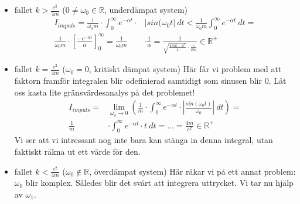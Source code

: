 \documentclass[10pt,a4paper]{article}
\begin{document}
\begin{itemize}
\item fallet $k>\frac{c^2}{4m}$ ($0\neq\omega_0 \in \mathbb{R}$, underdämpat system)
\begin{equation}
\begin{split}
I_{impuls}=\frac{1}{\omega_0  m} \cdot \int_{0}^{\infty}e^{-\alpha t}\cdot & | sin(\omega_0 t| \ dt <\frac{1}{\omega_0  m}\int_{0}^{\infty}e^{-\alpha t} \  dt =\\\frac{1}{\omega_0  m} \cdot \left[\frac{-e^{-\alpha t}}{\alpha}\right]_0^\infty= \frac{1}{\omega_0  m} & \cdot \frac{1}{\alpha}=\frac{1}{\sqrt{\frac{4 m k- c^2}{4}}\cdot\frac{c}{2m}}\in \mathbb{R}^+
\end{split}
\end{equation}
\item fallet $k=\frac{c^2}{4m}$ ($\omega_0=0$, kritiskt dämpat system)
\newline 
Här får vi problem med att faktorn framför integralen blir odefinierad samtidigt som sinusen blir 0. Låt oss kasta lite gränsvärdesanalys på det problemet!
\begin{equation}
\begin{split}
I_{impuls}= & \lim_{\omega_0\to0}\left(\frac{1}{m} \cdot \int_{0}^{\infty}e^{-\alpha t}\cdot |\frac{sin(\omega_0 t)}{\omega_0}| \ dt\right) = \\ \frac{1}{m} &\cdot\int_{0}^{\infty}e^{-\alpha t} \cdot t  \  dt=...=\frac{4m}{c^2}\in \mathbb{R}^+
\end{split}
\end{equation}
Vi ser att vi intressant nog inte bara kan stänga in denna integral, utan faktiskt räkna ut ett värde för den.
\item fallet $k<\frac{c^2}{4m}$ ($\omega_0 \notin \mathbb{R}$, överdämpat system)
\newline Här råkar vi på ett annat problem: $\omega_0$ blir komplex. Således blir det svårt att integrera uttrycket. Vi tar nu hjälp av $\omega_1$.


\end{itemize}
\end{document}
